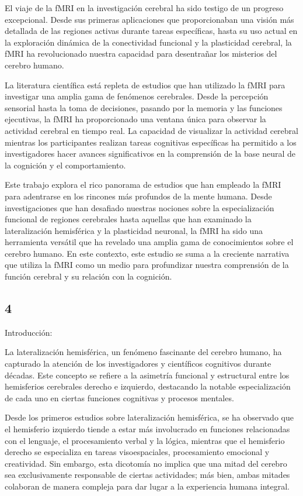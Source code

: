 \documentclass{article}
\begin{document}
	El viaje de la fMRI en la investigación cerebral ha sido testigo de un progreso excepcional. Desde sus primeras aplicaciones que proporcionaban una visión más detallada de las regiones activas durante tareas específicas, hasta su uso actual en la exploración dinámica de la conectividad funcional y la plasticidad cerebral, la fMRI ha revolucionado nuestra capacidad para desentrañar los misterios del cerebro humano.
	
	La literatura científica está repleta de estudios que han utilizado la fMRI para investigar una amplia gama de fenómenos cerebrales. Desde la percepción sensorial hasta la toma de decisiones, pasando por la memoria y las funciones ejecutivas, la fMRI ha proporcionado una ventana única para observar la actividad cerebral en tiempo real. La capacidad de visualizar la actividad cerebral mientras los participantes realizan tareas cognitivas específicas ha permitido a los investigadores hacer avances significativos en la comprensión de la base neural de la cognición y el comportamiento.
	
	Este trabajo explora el rico panorama de estudios que han empleado la fMRI para adentrarse en los rincones más profundos de la mente humana. Desde investigaciones que han desafiado nuestras nociones sobre la especialización funcional de regiones cerebrales hasta aquellas que han examinado la lateralización hemisférica y la plasticidad neuronal, la fMRI ha sido una herramienta versátil que ha revelado una amplia gama de conocimientos sobre el cerebro humano. En este contexto, este estudio se suma a la creciente narrativa que utiliza la fMRI como un medio para profundizar nuestra comprensión de la función cerebral y su relación con la cognición.
	
	\subsection{4}
	
	Introducción:
	
	La lateralización hemisférica, un fenómeno fascinante del cerebro humano, ha capturado la atención de los investigadores y científicos cognitivos durante décadas. Este concepto se refiere a la asimetría funcional y estructural entre los hemisferios cerebrales derecho e izquierdo, destacando la notable especialización de cada uno en ciertas funciones cognitivas y procesos mentales.
	
	Desde los primeros estudios sobre lateralización hemisférica, se ha observado que el hemisferio izquierdo tiende a estar más involucrado en funciones relacionadas con el lenguaje, el procesamiento verbal y la lógica, mientras que el hemisferio derecho se especializa en tareas visoespaciales, procesamiento emocional y creatividad. Sin embargo, esta dicotomía no implica que una mitad del cerebro sea exclusivamente responsable de ciertas actividades; más bien, ambas mitades colaboran de manera compleja para dar lugar a la experiencia humana integral.
	
\end{document}
